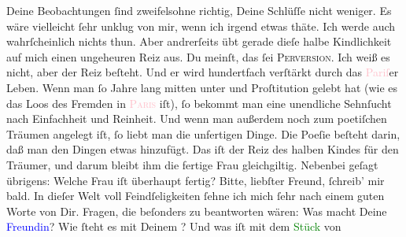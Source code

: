                Deine Beobachtungen {\pb}ſind zweifelsohne richtig,
               Deine  Schlüſſe nicht weniger. Es wäre vielleicht ſehr unklug von mir, wenn ich
               irgend etwas thäte. Ich werde auch wahrſcheinlich nichts thun. Aber andrerſeits übt
               gerade dieſe halbe Kindlichkeit auf mich  einen ungeheuren Reiz aus. Du meinſt, das ſei \textsc{Perversion}. Ich weiß es nicht, aber der Reiz beſteht. Und er wird
               hundertfach verſtärkt durch das \textcolor{pink}{Pariſ}{}\ledrightnote{\textcolor{pink}{Paris}}er Leben.
               Wenn man ſo Jahre lang mitten unter \label{K_L02833-8v}\label{K_L02833-8h} und Proſtitution gelebt hat (wie es das Loos des Fremden in \textsc{\textcolor{pink}{Paris}{}\ledrightnote{\textcolor{pink}{Paris}}} iſt), ſo bekommt man eine unendliche Sehnſucht nach {\pb}Einfachheit und Reinheit. Und wenn man außerdem noch
               zum poetiſchen Träumen  angelegt iſt, ſo liebt man die unfertigen
               Dinge. Die Poeſie beſteht darin, daß man den Dingen etwas hinzufügt. Das iſt der Reiz
               des halben Kindes für den Träumer, und darum bleibt \strikeout{\textcolor{gray}{×}\-\textcolor{gray}{×}} ihm die fertige Frau gleichgiltig. Nebenbei geſagt übrigens: Welche Frau iſt
               überhaupt fertig?\pend
           \pstart
           Bitte, liebſter Freund, ſchreib’ mir bald. In dieſer {\pb}Welt voll Feindſeligkeiten ſehne ich mich ſehr nach einem guten Worte von Dir.\pend
           \pstart
           Fragen, die beſonders zu beantworten wären: Was macht Deine \textcolor{blue}{Freundin}{}?  Wie ſteht es mit Deinem \label{K_L02833-99v}\label{K_L02833-99h}?
               Und was iſt mit dem \textcolor{green}{Stück}{} von
